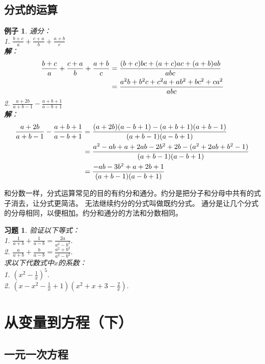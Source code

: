 \documentclass[12pt,UTF8]{ctexbook}
\newtheorem{ex}{例子}[section]
\newtheorem{xt}{习题}[section]
\begin{document}
\section{分式的运算}
\begin{ex}\label{ex:5-1-0}
    通分：\\
    1. $\frac{b+c}{a} + \frac{c+a}{b} + \frac{a+b}{c}$\\
    \textbf{解}：
    \begin{align}
        \frac{b+c}{a} + \frac{c+a}{b} + \frac{a+b}{c} &= \frac{(b+c)bc+(a+c)ac+(a+b)ab}{abc}\notag \\
        &= \frac{ a^2b+b^2c+c^2a + ab^2+bc^2+ca^2}{abc} \notag
    \end{align}
    2. $\frac{a+2b}{a+b-1} - \frac{a+b+1}{a-b+1}$\\
    \textbf{解}：
    \begin{align}
        \frac{a+2b}{a+b-1} - \frac{a+b+1}{a-b+1} &= \frac{(a+2b)(a-b+1) - (a+b+1)(a+b-1)}{(a+b-1)(a-b+1)}\notag \\
        &=  \frac{a^2-ab+a+2ab-2b^2+2b - (a^2+2ab+b^2-1)}{(a+b-1)(a-b+1)} \notag \\
        &= \frac{-ab-3b^2+a+2b+1}{(a+b-1)(a-b+1)} \notag
    \end{align}
\end{ex}

和分数一样，分式运算常见的目的有约分和通分。约分是把分子和分母中共有的式子消去，让分式更简洁。
无法继续约分的分式叫做既约分式。
通分是让几个分式的分母相同，以便相加。约分和通分的方法和分数相同。

\begin{xt}\label{xt:5-1-0}
    验证以下等式：\\
    1. $\frac{1}{a+b} + \frac{1}{a-b} = \frac{2a}{a^2-b^2}.$\\
    2. $\frac{a}{a+b} + \frac{b}{a-b} = \frac{a^2+b^2}{a^2-b^2}.$\\
    求以下代数式中$x$的系数：\\
    1. $(x^2 - \frac{1}{x})^5.$\\
    2. $(x - x^2 - \frac{1}{x} + 1)(x^2 + x + 3 - \frac{2}{x}).$
\end{xt}

\chapter{从变量到方程（下）}

\section{一元一次方程}
\end{document}
